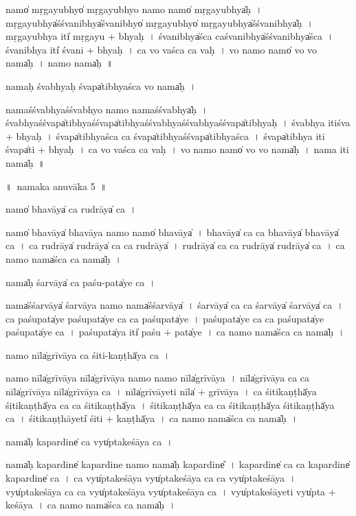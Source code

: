 \documentclass[parskip, DIV=14]{scrartcl}
\begin{document}
{namo̍ mṛga॒yubhyo̍ mṛga॒yubhyo॒ namo॒ namo̍ mṛga॒yubhya̍ḥ~।
mṛ॒ga॒yubhya̍śśva॒nibhya̍śva॒nibhyo̍ mṛga॒yubhyo̍ mṛga॒yubhya̍śśva॒nibhya̍ḥ~।
mṛ॒ga॒yubhya॒ iti̍ mṛga॒yu + bhya॒ḥ~।
śva॒nibhya̍śca caśva॒nibhya̍śśva॒nibhya̍śca~।
śva॒nibhya॒ iti̍ śva॒ni + bhya॒ḥ~।
ca॒ vo॒ va॒śca॒ ca॒ va॒ḥ~।
vo॒ namo॒ namo̍ vo vo॒ nama̍ḥ~।
namo॒ nama̍ḥ~॥ 

nama॒ḥ śvabhya॒ḥ śvapa̍tibhyaśca vo॒ nama̍ḥ~।

nama॒śśvabhya॒śśvabhyo॒ namo॒ nama॒śśvabhya̍ḥ~।
śvabhya॒śśvapa̍tibhya॒śśvapa̍tibhyaśśvabhya॒śśvabhya॒śśvapa̍tibhyaḥ~।
śvabhya॒ iti॒śva + bhya॒ḥ~।
śvapa̍tibhyaśca ca॒ śvapa̍tibhya॒śśvapa̍tibhyaśca~।
śvapa̍tibhya॒ iti॒ śvapa̍ti + bhya॒ḥ~।
ca॒ vo॒ va॒śca॒ ca॒ va॒ḥ~।
vo॒ namo॒ namo̍ vo vo॒ nama̍ḥ~।
nama॒ iti॒ nama̍ḥ~॥ 

\newpage
\LARGE
॥~namaka anuvāka 5~॥ 
\Large

namo̍ bha॒vāya̍ ca ru॒drāya̍ ca॒~।

namo̍ bha॒vāya̍ bha॒vāya॒ namo॒ namo̍ bha॒vāya̍~।
bha॒vāya̍ ca ca bha॒vāya̍ bha॒vāya̍ ca~।
ca॒ ru॒drāya̍ ru॒drāya̍ ca ca ru॒drāya̍~।
ru॒drāya̍ ca ca ru॒drāya̍ ru॒drāya̍ ca~।
ca॒ namo॒ nama̍śca ca॒ nama̍ḥ~।

nama̍ḥ śa॒rvāya̍ ca paśu॒-pata̍ye ca॒~।

nama̍śśa॒rvāya̍ śa॒rvāya॒ namo॒ nama̍śśa॒rvāya̍~।
śa॒rvāya̍ ca ca śa॒rvāya̍ śa॒rvāya̍ ca~।
ca॒ pa॒śu॒pata̍ye paśu॒pata̍ye ca ca paśu॒pata̍ye~।
pa॒śu॒pata̍ye ca ca paśu॒pata̍ye paśu॒pata̍ye ca~।
pa॒śu॒pata̍ya॒ iti̍ paśu + pata̍ye~।
ca॒ namo॒ nama̍śca ca॒ nama̍ḥ~।

namo॒ nīla̍grīvāya ca śiti॒-kaṇṭhā̍ya ca॒~।

namo॒ nīla̍grīvāya॒ nīla̍grīvāya॒ namo॒ namo॒ nīla̍grīvāya~।
nīla̍grīvāya ca ca॒ nīla̍grīvāya॒ nīla̍grīvāya ca~।
nīla̍grīvā॒yeti॒ nīla̍ + grī॒vā॒ya॒~।
ca॒ śi॒ti॒kaṇṭhā̍ya  śiti॒kaṇṭhā̍ya  ca ca śiti॒kaṇṭhā̍ya~।
śi॒ti॒kaṇṭhā̍ya ca ca śiti॒kaṇṭhā̍ya śiti॒kaṇṭhā̍ya ca~।
śi॒ti॒kaṇṭhā॒yeti̍ śiti + kaṇṭhā̍ya~।
ca॒ namo॒ nama̍śca ca॒ nama̍ḥ~।

nama̍ḥ kapa॒rdine̍ ca॒ vyu̍ptakeśāya ca॒~।

nama̍ḥ kapa॒rdine̍ kapa॒rdine॒ namo॒ nama̍ḥ kapa॒rdine̎~।
ka॒pa॒rdine̍ ca ca kapa॒rdine̍ kapa॒rdine̍ ca~।
ca॒ vyu̍ptakeśāya॒ vyu̍ptakeśāya ca ca॒  vyu̍ptakeśāya~।
vyu̍ptakeśāya ca ca॒  vyu̍ptakeśāya॒ vyu̍ptakeśāya ca~।
vyu̍ptakeśā॒yeti॒ vyu̍pta + ke॒śā॒ya॒~।
ca॒ namo॒ nama̍śca ca॒ nama̍ḥ~।

}
\end{document}
